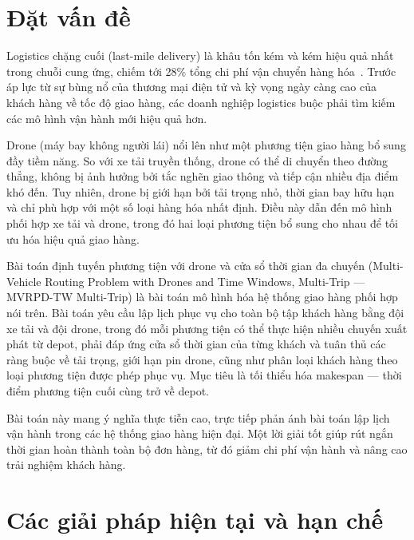 \documentclass[../DoAn.tex]{subfiles}
\begin{document}
\section{Đặt vấn đề}
\label{sec:dvd}

Logistics chặng cuối (last-mile delivery) là khâu tốn kém và kém hiệu quả nhất trong chuỗi cung ứng, chiếm tới 28\% tổng chi phí vận chuyển hàng hóa~\cite{gevaers2011characteristics}. Trước áp lực từ sự bùng nổ của thương mại điện tử và kỳ vọng ngày càng cao của khách hàng về tốc độ giao hàng, các doanh nghiệp logistics buộc phải tìm kiếm các mô hình vận hành mới hiệu quả hơn.

Drone (máy bay không người lái) nổi lên như một phương tiện giao hàng bổ sung đầy tiềm năng. So với xe tải truyền thống, drone có thể di chuyển theo đường thẳng, không bị ảnh hưởng bởi tắc nghẽn giao thông và tiếp cận nhiều địa điểm khó đến. Tuy nhiên, drone bị giới hạn bởi tải trọng nhỏ, thời gian bay hữu hạn và chỉ phù hợp với một số loại hàng hóa nhất định. Điều này dẫn đến mô hình phối hợp xe tải và drone, trong đó hai loại phương tiện bổ sung cho nhau để tối ưu hóa hiệu quả giao hàng.

Bài toán định tuyến phương tiện với drone và cửa sổ thời gian đa chuyến (Multi-Vehicle Routing Problem with Drones and Time Windows, Multi-Trip --- MVRPD-TW Multi-Trip) là bài toán mô hình hóa hệ thống giao hàng phối hợp nói trên. Bài toán yêu cầu lập lịch phục vụ cho toàn bộ tập khách hàng bằng đội xe tải và đội drone, trong đó mỗi phương tiện có thể thực hiện nhiều chuyến xuất phát từ depot, phải đáp ứng cửa sổ thời gian của từng khách và tuân thủ các ràng buộc về tải trọng, giới hạn pin drone, cũng như phân loại khách hàng theo loại phương tiện được phép phục vụ. Mục tiêu là tối thiểu hóa makespan --- thời điểm phương tiện cuối cùng trở về depot.

Bài toán này mang ý nghĩa thực tiễn cao, trực tiếp phản ánh bài toán lập lịch vận hành trong các hệ thống giao hàng hiện đại. Một lời giải tốt giúp rút ngắn thời gian hoàn thành toàn bộ đơn hàng, từ đó giảm chi phí vận hành và nâng cao trải nghiệm khách hàng.

\section{Các giải pháp hiện tại và hạn chế}
\label{sec:giaiphap}
\end{document}
